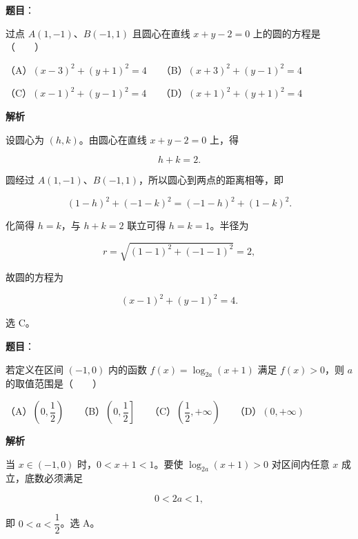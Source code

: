 \begin{answer}

\textbf{题目}：

过点 $A(1,-1)$、$B(-1,1)$ 且圆心在直线 $x+y-2=0$ 上的圆的方程是\mbox{（　　）}

（A）$(x-3)^2+(y+1)^2=4$　　（B）$(x+3)^2+(y-1)^2=4$

（C）$(x-1)^2+(y-1)^2=4$　　（D）$(x+1)^2+(y+1)^2=4$

\textbf{解析}

设圆心为 $(h,k)$。由圆心在直线 $x+y-2=0$ 上，得

\nopagebreak[4]
\[
h+k=2.
\]

圆经过 $A(1,-1)$、$B(-1,1)$，所以圆心到两点的距离相等，即

\nopagebreak[4]
\[
(1-h)^2+(-1-k)^2=(-1-h)^2+(1-k)^2.
\]

化简得 $h=k$，与 $h+k=2$ 联立可得 $h=k=1$。半径为

\nopagebreak[4]
\[
r=\sqrt{(1-1)^2+(-1-1)^2}=2,
\]

故圆的方程为

\nopagebreak[4]
\[
(x-1)^2+(y-1)^2=4.
\]

选 C。


\end{answer}
\begin{answer}

\textbf{题目}：

若定义在区间 $(-1,0)$ 内的函数 $f(x)=\log_{2a}(x+1)$ 满足 $f(x)>0$，则 $a$ 的取值范围是\mbox{（　　）}

（A）$\left(0,\dfrac12\right)$　　（B）$\left(0,\dfrac12\right]$　　（C）$\left(\dfrac12,+\infty\right)$　　（D）$(0,+\infty)$

\textbf{解析}

当 $x\in(-1,0)$ 时，$0<x+1<1$。要使 $\log_{2a}(x+1)>0$ 对区间内任意 $x$ 成立，底数必须满足

\nopagebreak[4]
\[
0<2a<1,
\]

即 $0<a<\dfrac12$。选 A。


\end{answer}
